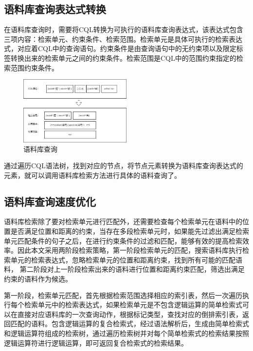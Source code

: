 \documentclass[11pt]{article}
\begin{document}
\begin{CJK*}{UTF8}{gbsn}
\subsection{语料库查询表达式转换}

在语料库查询时，需要将CQL转换为可执行的语料库查询表达式，该表达式包含三项内容：检索单元、约束条件、检索范围。检索单元是具体可执行的检索表达式，对应着CQL中的查询语句。约束条件是由查询语句中的无约束项以及限定标签转换出来的检索单元之间的约束条件。检索范围是CQL中的范围约束指定的检索范围约束条件。


\begin{figure}[h]
	\centering
	\includegraphics[width=0.5\textwidth]{image/jiansuoshi.jpg}
	\caption{语料库查询}
	\label{fig:jisnsuoshi}
\end{figure}

通过遍历CQL语法树，找到对应的节点，将节点元素转换为语料库查询表达式的元素，就可以调用语料库检索方法进行具体的语料查询了。


\subsection{语料库查询速度优化}


语料库检索除了要对检索单元进行匹配外，还需要检查每个检索单元在语料中的位置是否满足位置和距离的约束，当存在多段检索单元时，如果能先过滤出满足检索单元匹配条件的句子之后，在进行约束条件的过滤和匹配，能够有效的提高检索效率。因此本文采用两阶段检索策略，第一阶段检索单元的匹配，搜索语料库执行检索单元的检索表达式，忽略检索单元的位置和距离约束，找到所有可能的匹配语料， 第二阶段对上一阶段检索出来的语料进行位置和距离约束匹配，筛选出满足约束的语料作为候选。

第一阶段，检索单元匹配，首先根据检索范围选择相应的索引表，然后一次遍历执行每个检索单元中的检索表达式，如果检索单元是不包含逻辑运算的简单检索式可以在直接对应语料库的一次查询动作，根据标记类型，查找对应的倒排索引表，返回匹配的语料。包含逻辑运算的复合检索式，经过语法解析后，生成由简单检索式和逻辑运算符组成的检索树，通过遍历检索树并对每个简单检索式的检索结果按照逻辑运算符进行逻辑运算，即可返回复合检索式的检索结果。


\end{CJK*}
\end{document}
